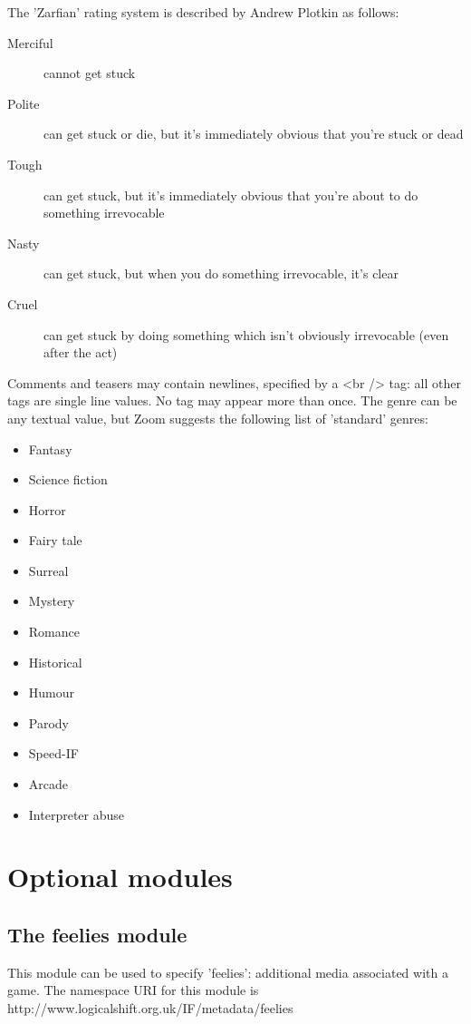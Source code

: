 \documentclass[a4paper,11pt]{article}
\begin{document}
The 'Zarfian' rating system is described by Andrew Plotkin as follows:

\begin{description}
\item[Merciful] cannot get stuck
\item[Polite] can get stuck or die, but it's immediately obvious that you're stuck or dead
\item[Tough] can get stuck, but it's immediately obvious that you're about to do something 
irrevocable
\item[Nasty] can get stuck, but when you do something irrevocable, it's clear 
\item[Cruel] can get stuck by doing something which isn't obviously irrevocable (even after the act)
\end{description}

Comments and teasers may contain newlines, specified by a <br /> tag: all other tags are
single line values. No tag may appear more than once. The genre can be any textual value,
but Zoom suggests the following list of 'standard' genres:

\begin{itemize}
\item Fantasy
\item Science fiction
\item Horror
\item Fairy tale
\item Surreal
\item Mystery
\item Romance
\item Historical
\item Humour
\item Parody
\item Speed-IF
\item Arcade
\item Interpreter abuse
\end{itemize}

\section{Optional modules}

\subsection{The feelies module}

This module can be used to specify 'feelies': additional media associated with a game. The namespace URI for this module is 
http://www.logicalshift.org.uk/IF/metadata/feelies
\end{document}
